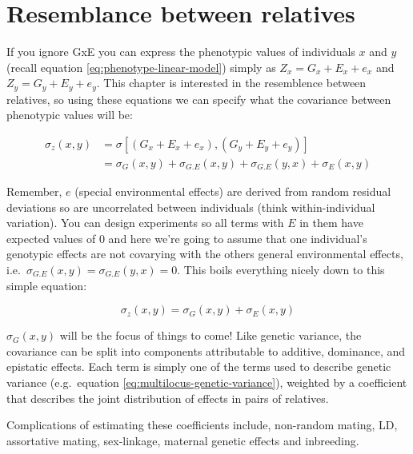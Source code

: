 \documentclass[
]{book}
\begin{document}
\hypertarget{resemblance-between-relatives}{%
\chapter{Resemblance between relatives}\label{resemblance-between-relatives}}

If you ignore GxE you can express the phenotypic values of individuals \(x\) and \(y\) (recall equation \eqref{eq:phenotype-linear-model}) simply as \(Z_x = G_x + E_x + e_x\) and \(Z_y = G_y + E_y + e_y\). This chapter is interested in the resemblence between relatives, so using these equations we can specify what the covariance between phenotypic values will be:

\begin{equation}
\begin{split}
  \sigma_z(x, y) &= \sigma[(G_x + E_x + e_x), (G_y + E_y + e_y)] \\
  &= \sigma_G(x, y) + \sigma_{G.E}(x, y) + \sigma_{G.E}(y, x) + \sigma_{E}(x, y)
\end{split}
\label{eq:phenotypic-covariance-no-gxe}
\end{equation}

Remember, \(e\) (special environmental effects) are derived from random residual deviations so are uncorrelated between individuals (think within-individual variation). You can design experiments so all terms with \(E\) in them have expected values of 0 and here we're going to assume that one individual's genotypic effects are not covarying with the others general environmental effects, i.e.~\(\sigma_{G.E}(x, y) = \sigma_{G.E}(y, x) = 0\). This boils everything nicely down to this simple equation:

\begin{equation}
  \sigma_z(x, y) = \sigma_G(x, y) + \sigma_{E}(x, y)
  \label{eq:phenotypic-covariance-no-gxe-simple}
\end{equation}

\(\sigma_G(x, y)\) will be the focus of things to come! Like genetic variance, the covariance can be split into components attributable to additive, dominance, and epistatic effects. Each term is simply one of the terms used to describe genetic variance (e.g.~equation \eqref{eq:multilocus-genetic-variance}), weighted by a coefficient that describes the joint distribution of effects in pairs of relatives.

Complications of estimating these coefficients include, non-random mating, LD, assortative mating, sex-linkage, maternal genetic effects and inbreeding.
\end{document}
